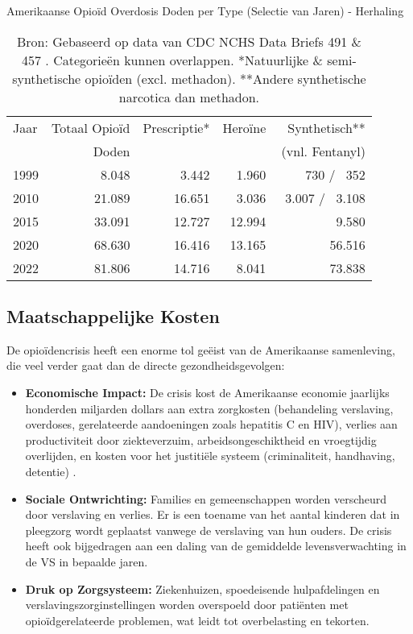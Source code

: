\documentclass[11pt, a4paper]{report} %
\begin{document}
\begin{table}[htbp]
    \centering
    \caption{Amerikaanse Opioïd Overdosis Doden per Type (Selectie van Jaren) - Herhaling}
    \label{tab:overdose_data_repeat} %
    \begin{tabular}{l r r r r}
        \toprule
        Jaar & Totaal Opioïd & Prescriptie* & Heroïne & Synthetisch** \\
             & Doden         &              &         & (vnl. Fentanyl) \\
        \midrule
        1999 & 8.048         & 3.442        & 1.960   & ~730 / ~352 \\
        2010 & 21.089        & 16.651       & 3.036   & ~3.007 / ~3.108 \\
        2015 & 33.091        & 12.727       & 12.994  & 9.580 \\
        2020 & 68.630        & 16.416       & 13.165  & 56.516 \\
        2022 & 81.806        & 14.716       & 8.041   & 73.838 \\
        \bottomrule
    \end{tabular}
    \caption*{\footnotesize Bron: Gebaseerd op data van CDC NCHS Data Briefs 491 \& 457 \parencite{CDC2024DataBrief491, CDC2022DataBrief457}. Categorieën kunnen overlappen. *Natuurlijke \& semi-synthetische opioïden (excl. methadon). **Andere synthetische narcotica dan methadon.}
\end{table}

\subsection{Maatschappelijke Kosten}
De opioïdencrisis heeft een enorme tol geëist van de Amerikaanse samenleving, die veel verder gaat dan de directe gezondheidsgevolgen:
\begin{itemize}
    \item \textbf{Economische Impact:} De crisis kost de Amerikaanse economie jaarlijks honderden miljarden dollars aan extra zorgkosten (behandeling verslaving, overdoses, gerelateerde aandoeningen zoals hepatitis C en HIV), verlies aan productiviteit door ziekteverzuim, arbeidsongeschiktheid en vroegtijdig overlijden, en kosten voor het justitiële systeem (criminaliteit, handhaving, detentie) \parencite{Brookings2017EconomicImpact}.
    \item \textbf{Sociale Ontwrichting:} Families en gemeenschappen worden verscheurd door verslaving en verlies. Er is een toename van het aantal kinderen dat in pleegzorg wordt geplaatst vanwege de verslaving van hun ouders. De crisis heeft ook bijgedragen aan een daling van de gemiddelde levensverwachting in de VS in bepaalde jaren.
    \item \textbf{Druk op Zorgsysteem:} Ziekenhuizen, spoedeisende hulpafdelingen en verslavingszorginstellingen worden overspoeld door patiënten met opioïdgerelateerde problemen, wat leidt tot overbelasting en tekorten.
\end{itemize}
\end{document}

